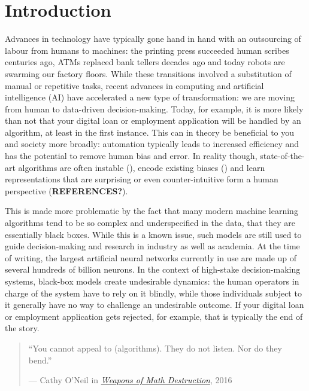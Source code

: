 \documentclass[
  letterpaper,
  DIV=11,
  numbers=noendperiod]{scrartcl}
\author{}
\date{}
\begin{document}
\hypertarget{sec-intro}{%
\section{Introduction}\label{sec-intro}}

Advances in technology have typically gone hand in hand with an
outsourcing of labour from humans to machines: the printing press
succeeded human scribes centuries ago, ATMs replaced bank tellers
decades ago and today robots are swarming our factory floors. While
these transitions involved a substitution of manual or repetitive tasks,
recent advances in computing and artificial intelligence (AI) have
accelerated a new type of transformation: we are moving from human to
data-driven decision-making. Today, for example, it is more likely than
not that your digital loan or employment application will be handled by
an algorithm, at least in the first instance. This can in theory be
beneficial to you and society more broadly: automation typically leads
to increased efficiency and has the potential to remove human bias and
error. In reality though, state-of-the-art algorithms are often instable
(\cite{goodfellow2014explaining}), encode existing biases
(\cite{buolamwini2018gender}) and learn representations that are
surprising or even counter-intuitive form a human perspective
(\textbf{REFERENCES?}).

This is made more problematic by the fact that many modern machine
learning algorithms tend to be so complex and underspecified in the
data, that they are essentially black boxes. While this is a known
issue, such models are still used to guide decision-making and research
in industry as well as academia. At the time of writing, the largest
artificial neural networks currently in use are made up of several
hundreds of billion neurons. In the context of high-stake
decision-making systems, black-box models create undesirable dynamics:
the human operators in charge of the system have to rely on it blindly,
while those individuals subject to it generally have no way to challenge
an undesirable outcome. If your digital loan or employment application
gets rejected, for example, that is typically the end of the story.

\begin{quote}
``You cannot appeal to (algorithms). They do not listen. Nor do they
bend.''

--- Cathy O'Neil in
\href{https://en.wikipedia.org/wiki/Weapons_of_Math_Destruction}{\emph{Weapons
of Math Destruction}}, 2016
\end{quote}
\end{document}
